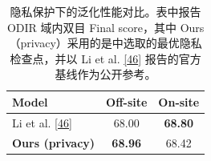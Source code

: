 \begin{table}[!htb]
\centering
\caption{隐私保护下的泛化性能对比。表中报告 ODIR 域内双目 Final score，其中 Ours（privacy）采用的是中选取的最优隐私检查点，并以 Li et al. \hyperref[_Ref213949402]{{[}46{]}} 报告的官方基线作为公开参考。}
\label{tab:privacy-final}
\begin{tabular}{lcc}
\toprule
Model & Off-site & On-site \\
\midrule
Li et al. \hyperref[_Ref213949402]{{[}46{]}} & 68.00 & \textbf{68.80} \\
\textbf{Ours (privacy)} & \textbf{68.96} & 68.42 \\
\bottomrule
\end{tabular}
\end{table}
